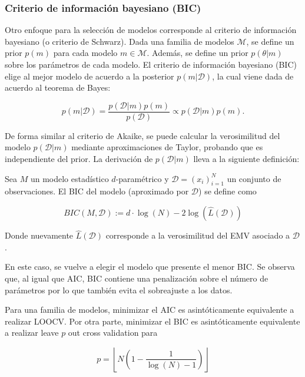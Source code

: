 \subsubsection{Criterio de información bayesiano (BIC)}

Otro enfoque para la selección de modelos corresponde al criterio de información bayesiano (o criterio de Schwarz). Dada una familia de modelos $\mathcal{M}$, se define un prior $p(m)$ para cada modelo $m\in\mathcal{M}$. Además, se define un prior $p(\theta|m)$ sobre los parámetros de cada modelo. El criterio de información bayesiano (BIC) elige al mejor modelo de acuerdo a la posterior $p(m|\mathcal{D})$, la cual viene dada de acuerdo al teorema de Bayes:

\begin{equation}
	p(m|\mathcal{D})=\frac{p(\mathcal{D}|m)p(m)}{p(\mathcal{D})}\propto p(\mathcal{D}|m)p(m).
\end{equation}

De forma similar al criterio de Akaike, se puede calcular la verosimilitud del modelo $p(\mathcal{D}|m)$ mediante aproximaciones de Taylor, probando que es independiente del prior. La derivación de $p(\mathcal{D}|m)$ lleva a la siguiente definición:

\begin{definition}[BIC]
	Sea $M$ un modelo estadístico $d$-paramétrico y $\mathcal{D}=(x_i)_{i=1}^N$ un conjunto de observaciones. El BIC del modelo (aproximado por $\mathcal{D}$) se define como
	
	\begin{equation}
		BIC(M,\mathcal{D}):= d\cdot\log(N) - 2\log\left(\hat{L}(\mathcal{D})\right)
	\end{equation}
	
	Donde nuevamente $\hat{L}(\mathcal{D})$ corresponde a la verosimilitud del EMV asociado a $\mathcal{D}$.
\end{definition}

En este caso, se vuelve a elegir el modelo que presente el menor BIC. Se observa que, al igual que AIC, BIC contiene una penalización sobre el número de parámetros por lo que también evita el sobreajuste a los datos.

\begin{remark} Para una familia de modelos, minimizar el AIC es asintóticamente equivalente a realizar LOOCV. Por otra parte, minimizar el BIC es asintóticamente equivalente a realizar leave $p$ out cross validation para

\begin{equation}
	p=\left\lfloor N\left(1-\frac{1}{\log(N)-1}\right)\right\rfloor
\end{equation}
	
\end{remark}


